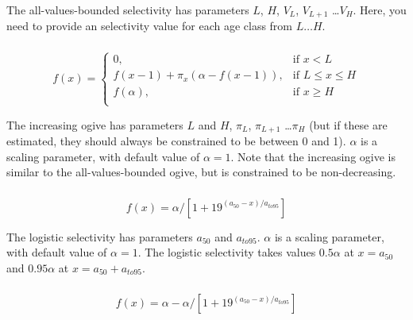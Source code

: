 The all-values-bounded selectivity has parameters  $L$, $H$, $V_L$, $V_{L+1}$ \ldots $V_H$. Here, you need to provide an selectivity value for each age class from $L \ldots H$.

\subsubsection[Increasing]{}

\begin{equation} 
f(x)=\begin{cases}
	  0, & \text{if $x < L$} \\
	  f(x-1)+ \pi_x(\alpha-f(x-1)), & \text{if $L \le x \le H$} \\
	  f(\alpha), & \text{if $x \ge H$} \\  
  \end{cases}
\end{equation}

The increasing ogive has parameters $L$ and $H$, $\pi_L$, $\pi_{L+1}$ \ldots $\pi_H$ (but if these are estimated, they should always be constrained to be between 0 and 1). $\alpha$ is a scaling parameter, with default value of $\alpha = 1$. Note that the increasing ogive is similar to the all-values-bounded ogive, but is constrained to be non-decreasing.

\subsubsection[Logistic]{}

\begin{equation}
  f(x) = \alpha / [1+19^{(a_{50}-x)/a_{to95}}]
\end{equation}
 
The logistic selectivity has parameters $a_{50}$ and $a_{to95}$. $\alpha$ is a scaling parameter, with default value of $\alpha = 1$. The logistic selectivity takes values $0.5 \alpha$ at $x=a_{50}$ and $0.95 \alpha$ at $x=a_{50}+a_{to95}$. 

\subsubsection[Inverse logistic]{}

\begin{equation}
  f(x) = \alpha - \alpha / [1+19^{(a_{50}-x)/a_{to95}}]
\end{equation}
 

